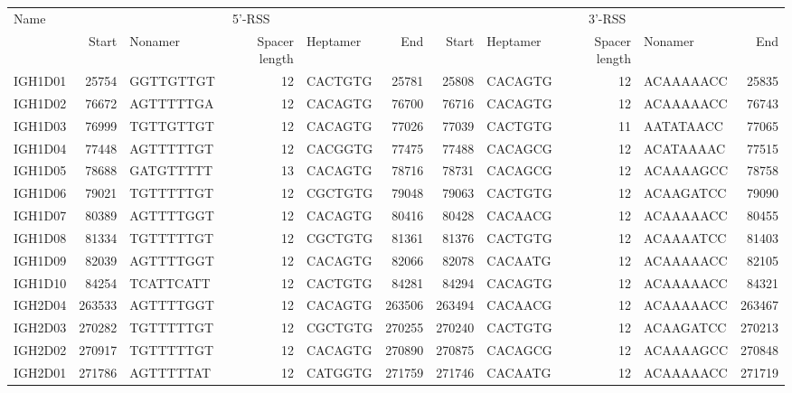 \begin{tabular}{l|rlrlr|rlrlr}\toprule
  \multirow{2}{*}{Name} & \multicolumn{5}{c|}{5'-RSS} & \multicolumn{5}{c}{3'-RSS} \\
    ~ & Start & Nonamer & Spacer length & Heptamer & End & Start & Heptamer & Spacer length & Nonamer & End \\\midrule
  IGH1D01 & 25754 & GGTTGTTGT & 12 & CACTGTG & 25781 & 25808 & CACAGTG & 12 & ACAAAAACC & 25835 \\ 
  IGH1D02 & 76672 & AGTTTTTGA & 12 & CACAGTG & 76700 & 76716 & CACAGTG & 12 & ACAAAAACC & 76743 \\ 
  IGH1D03 & 76999 & TGTTGTTGT & 12 & CACAGTG & 77026 & 77039 & CACTGTG & 11 & AATATAACC & 77065 \\ 
  IGH1D04 & 77448 & AGTTTTTGT & 12 & CACGGTG & 77475 & 77488 & CACAGCG & 12 & ACATAAAAC & 77515 \\ 
  IGH1D05 & 78688 & GATGTTTTT & 13 & CACAGTG & 78716 & 78731 & CACAGCG & 12 & ACAAAAGCC & 78758 \\ 
  IGH1D06 & 79021 & TGTTTTTGT & 12 & CGCTGTG & 79048 & 79063 & CACTGTG & 12 & ACAAGATCC & 79090 \\ 
  IGH1D07 & 80389 & AGTTTTGGT & 12 & CACAGTG & 80416 & 80428 & CACAACG & 12 & ACAAAAACC & 80455 \\ 
  IGH1D08 & 81334 & TGTTTTTGT & 12 & CGCTGTG & 81361 & 81376 & CACTGTG & 12 & ACAAAATCC & 81403 \\ 
  IGH1D09 & 82039 & AGTTTTGGT & 12 & CACAGTG & 82066 & 82078 & CACAATG & 12 & ACAAAAACC & 82105 \\ 
  IGH1D10 & 84254 & TCATTCATT & 12 & CACTGTG & 84281 & 84294 & CACAGTG & 12 & ACAAAAACC & 84321 \\ 
  IGH2D04 & 263533 & AGTTTTGGT & 12 & CACAGTG & 263506 & 263494 & CACAACG & 12 & ACAAAAACC & 263467 \\ 
  IGH2D03 & 270282 & TGTTTTTGT & 12 & CGCTGTG & 270255 & 270240 & CACTGTG & 12 & ACAAGATCC & 270213 \\ 
  IGH2D02 & 270917 & TGTTTTTGT & 12 & CACAGTG & 270890 & 270875 & CACAGCG & 12 & ACAAAAGCC & 270848 \\ 
  IGH2D01 & 271786 & AGTTTTTAT & 12 & CATGGTG & 271759 & 271746 & CACAATG & 12 & ACAAAAACC & 271719 \\ 
   \bottomrule \end{tabular}
